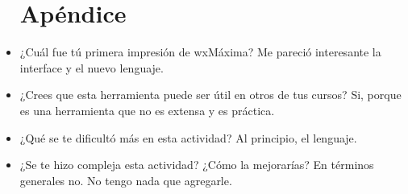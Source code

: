 \documentclass{article}
\begin{document}
\begin{itemize}
\section{Apéndice}
\item ¿Cuál fue tú primera impresión de wxMáxima?
Me pareció interesante la interface y el nuevo lenguaje.
\item ¿Crees que esta herramienta puede ser útil en otros de tus cursos?
Si, porque es una herramienta que no es extensa y es práctica.
\item ¿Qué se te dificultó más en esta actividad?
Al principio, el lenguaje.
\item ¿Se te hizo compleja esta actividad? ¿Cómo la mejorarías? 
En términos generales no. No tengo nada que agregarle.

\end{itemize}
\end{document}
